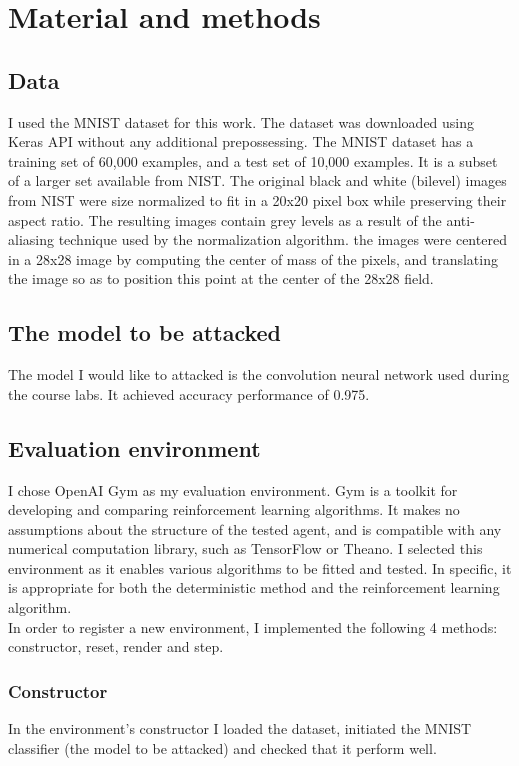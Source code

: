 \documentclass{article}
\begin{document}
\section{Material and methods}

\subsection{Data}
I used the MNIST \cite{mnist10027939599} dataset for this work. The dataset was downloaded using Keras API without any additional prepossessing. 
The MNIST dataset has a training set of 60,000 examples, and a test set of 10,000 examples. It is a subset of a larger set available from NIST. The original black and white (bilevel) images from NIST were size normalized to fit in a 20x20 pixel box while preserving their aspect ratio. The resulting images contain grey levels as a result of the anti-aliasing technique used by the normalization algorithm. the images were centered in a 28x28 image by computing the center of mass of the pixels, and translating the image so as to position this point at the center of the 28x28 field. \\

\subsection{The model to be attacked}
The model I would like to attacked is the convolution neural network used during the course labs. It achieved accuracy performance of 0.975.

\subsection{Evaluation environment}
I chose OpenAI Gym \cite{brockman2016openai} as my evaluation environment. Gym is a toolkit for developing and comparing reinforcement learning algorithms. It makes no assumptions about the structure of the tested agent, and is compatible with any numerical computation library, such as TensorFlow or Theano.
I selected this environment as it enables various algorithms to be fitted and tested. In specific, it is appropriate for both the deterministic method and the reinforcement learning algorithm. \\
In order to register a new environment, I implemented the following 4 methods: constructor, reset, render and step.
\subsubsection{Constructor}
In the environment's constructor I loaded the dataset, initiated the MNIST classifier (the model to be attacked) and checked that it perform well.
\end{document}

